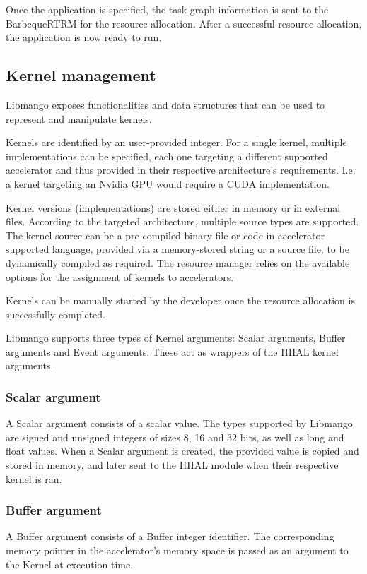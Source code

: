 Once the application is specified, the task graph information is sent to the BarbequeRTRM for the resource allocation. After a successful resource allocation, the application is now ready to run.

\subsection{Kernel management} \label{Libmango:KernelManagement}
Libmango exposes functionalities and data structures that can be used to represent and manipulate kernels.

Kernels are identified by an user-provided integer. For a single kernel, multiple implementations can be specified, each one targeting a different supported accelerator and thus provided in their respective architecture's requirements. I.e. a kernel targeting an Nvidia GPU would require a CUDA implementation.

Kernel versions (implementations) are stored either in memory or in external files. According to the targeted architecture, multiple source types are supported. The kernel source can be a pre-compiled binary file or code in accelerator-supported language, provided via a memory-stored string or a source file, to be dynamically compiled as required.
The resource manager relies on the available options for the assignment of kernels to accelerators.

Kernels can be manually started by the developer once the resource allocation is successfully completed.

Libmango supports three types of Kernel arguments: Scalar arguments, Buffer arguments and Event arguments.
These act as wrappers of the HHAL kernel arguments.

\subsubsection{Scalar argument}
A Scalar argument consists of a scalar value. The types supported by Libmango are signed and unsigned integers of sizes 8, 16 and 32 bits, as well as long and float values. 
When a Scalar argument is created, the provided value is copied and stored in memory, and later sent to the HHAL module when their respective kernel is ran. 

\subsubsection{Buffer argument}
A Buffer argument consists of a Buffer integer identifier. The corresponding memory pointer in the accelerator's memory space is passed as an argument to the Kernel at execution time.

